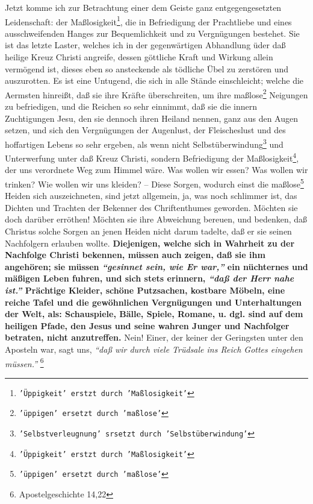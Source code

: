 Jetzt komme ich zur Betrachtung einer dem Geiste ganz entgegengesetzten
Leidenschaft: der Maßlosigkeit\footnote{\texttt{'Üppigkeit' erstzt durch 'Maßlosigkeit'}}, die in Befriedigung der Prachtliebe und eines
ausschweifenden Hanges zur Bequemlichkeit und zu Vergnügungen bestehet. Sie ist
das letzte Laster, welches ich in der gegenwärtigen Abhandlung üder daß heilige
Kreuz Christi angreife, dessen göttliche Kraft und Wirkung allein vermögend ist,
dieses eben so ansteckende als tödliche Übel zu zerstören und auszurotten. Es
ist eine Untugend, die sich in alle Stände einschleicht; welche die Aermsten
hinreißt, daß sie ihre Kräfte überschreiten, um ihre maßlose\footnote{\texttt{'üppigen' ersetzt durch 'maßlose'}} Neigungen zu
befriedigen, und die Reichen so sehr einnimmt, daß sie die innern Zuchtigungen
Jesu, den sie dennoch ihren Heiland nennen, ganz aus den Augen setzen, und sich
den Vergnügungen der Augenlust, der Fleischeslust und des hoffartigen Lebens so
sehr ergeben, als wenn nicht Selbstüberwindung\footnote{\texttt{'Selbstverleugnung' srsetzt durch 'Selbstüberwindung'}} und Unterwerfung unter daß Kreuz
Christi, sondern Befriedigung der Maßlosigkeit\footnote{\texttt{'Üppigkeit' erstzt durch 'Maßlosigkeit'}}, der uns verordnete Weg zum Himmel
wäre. Was wollen wir essen? Was wollen wir trinken? Wie wollen wir uns kleiden?
-- Diese Sorgen, wodurch einst die maßlose\footnote{\texttt{'üppigen' ersetzt durch 'maßlose'}} Heiden sich auszeichneten, sind jetzt
allgemein, ja, was noch schlimmer ist, das Dichten und Trachten der Bekenner des
Chriftenthumes geworden. Möchten sie doch darüber erröthen! Möchten sie ihre
Abweichung bereuen, und bedenken, daß Christus solche Sorgen an jenen Heiden
nicht darum tadelte, daß er sie seinen Nachfolgern erlauben wollte. \textbf{Diejenigen,
welche sich in Wahrheit zu der Nachfolge Christi bekennen, müssen auch zeigen,
daß sie ihm angehören; sie müssen
\textit{"`gesinnet sein, wie Er war,"'} ein nüchternes
und mäßigen Leben fuhren, und sich stets erinnern,
\textit{"`daß der Herr nahe ist."'}
Prächtige Kleider, schöne Putzsachen, kostbare Möbeln, eine reiche Tafel und die
gewöhnlichen Vergnügungen und Unterhaltungen der Welt, als: Schauspiele, Bälle,
Spiele, Romane, u. dgl. sind auf dem heiligen Pfade, den Jesus und seine wahren
Junger und Nachfolger betraten, nicht anzutreffen.} Nein! Einer, der keiner der
Geringsten unter den Aposteln war, sagt uns,
\textit{"`daß wir durch viele Trüdsale ins
Reich Gottes eingehen müssen."'}
\footnote{Apostelgeschichte 14,22}


